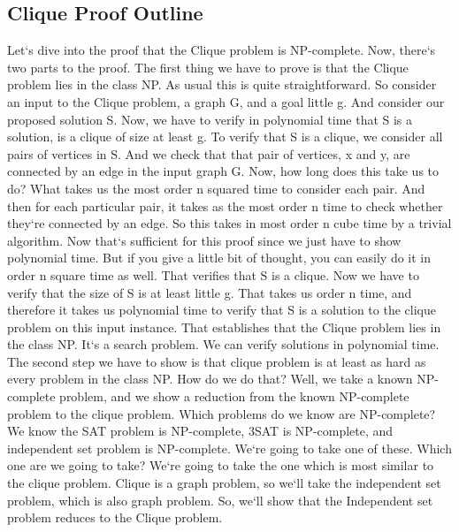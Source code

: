 \subsection{Clique  Proof Outline}
Let`s dive into the proof that the Clique problem is NP-complete.
Now, there`s two parts to the proof.
The first thing we have to prove is that the Clique problem lies in the class NP\@.
As usual this is quite straightforward.
So consider an input to the Clique problem, a graph G, and a goal little g.
And consider our proposed solution S\@.
Now, we have to verify in polynomial time that S is a solution, is a clique of size at least g.
To verify that S is a clique, we consider all pairs of vertices in S\@.
And we check that that pair of vertices, x and y, are connected by an edge in the input graph G\@.
Now, how long does this take us to do? What takes us the most order n squared time to consider each pair.
And then for each particular pair, it takes as the most order n time to check whether they`re connected by an edge.
So this takes in most order n cube time by a trivial algorithm.
Now that`s sufficient for this proof since we just have to show polynomial time.
But if you give a little bit of thought, you can easily do it in order n square time as well.
That verifies that S is a clique.
Now we have to verify that the size of S is at least little g.
That takes us order n time, and therefore it takes us polynomial time to verify that S is a solution to the clique problem on this input instance.
That establishes that the Clique problem lies in the class NP\@.
It`s a search problem.
We can verify solutions in polynomial time.
The second step we have to show is that clique problem is at least as hard as every problem in the class NP\@.
How do we do that? Well, we take a known NP-complete problem, and we show a reduction from the known NP-complete problem to the clique problem.
Which problems do we know are NP-complete? We know the SAT problem is NP-complete, 3SAT is NP-complete, and independent set problem is NP-complete.
We`re going to take one of these.
Which one are we going to take? We`re going to take the one which is most similar to the clique problem.
Clique is a graph problem, so we`ll take the independent set problem, which is also graph problem.
So, we`ll show that the Independent set problem reduces to the Clique problem.

